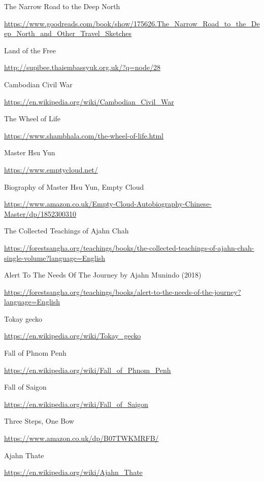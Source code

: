 \begin{thebibliography}{9}
 The Narrow Road to the Deep North

  {\urlsize \url{https://www.goodreads.com/book/show/175626.The_Narrow_Road_to_the_Deep_North_and_Other_Travel_Sketches}}

 Land of the Free

  {\urlsize \url{http://supibee.thaiembassyuk.org.uk/?q=node/28}}

 Cambodian Civil War

  {\urlsize \url{https://en.wikipedia.org/wiki/Cambodian_Civil_War}}

 The Wheel of Life

  {\urlsize \url{https://www.shambhala.com/the-wheel-of-life.html}}

 Master Hsu Yun

  {\urlsize \url{https://www.emptycloud.net/}}

 Biography of Master Hsu Yun, Empty Cloud

  {\urlsize \url{https://www.amazon.co.uk/Empty-Cloud-Autobiography-Chinese-Master/dp/1852300310}}

 The Collected Teachings of Ajahn Chah

  {\urlsize \url{https://forestsangha.org/teachings/books/the-collected-teachings-of-ajahn-chah-single-volume?language=English}}

 Alert To The Needs Of The Journey by Ajahn Munindo (2018)

  {\urlsize \url{https://forestsangha.org/teachings/books/alert-to-the-needs-of-the-journey?language=English}}

 Tokay gecko

  {\urlsize \url{https://en.wikipedia.org/wiki/Tokay_gecko}}

 Fall of Phnom Penh

  {\urlsize \url{https://en.wikipedia.org/wiki/Fall_of_Phnom_Penh}}

 Fall of Saigon

  {\urlsize \url{https://en.wikipedia.org/wiki/Fall_of_Saigon}}

 Three Steps, One Bow

  {\urlsize \url{https://www.amazon.co.uk/dp/B07TWKMRFB/}}

 Ajahn Thate

  {\urlsize \url{https://en.wikipedia.org/wiki/Ajahn_Thate}}


\end{thebibliography}
